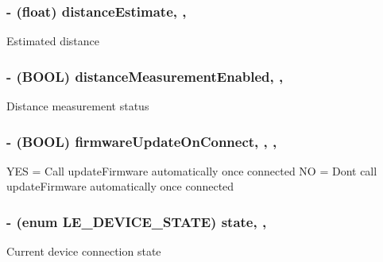 \subsubsection[{distance\+Estimate}]{\setlength{\rightskip}{0pt plus 5cm}-\/ (float) distance\+Estimate\hspace{0.3cm}{\ttfamily [read]}, {\ttfamily [nonatomic]}, {\ttfamily [assign]}}\label{interface_le_snf_device_ab5b9db7753a961a6062947950e516688}
Estimated distance \hypertarget{interface_le_snf_device_a21f7ccd07695a5dec79fa82a6cce2b17}{}
\subsubsection[{distance\+Measurement\+Enabled}]{\setlength{\rightskip}{0pt plus 5cm}-\/ (B\+O\+O\+L) distance\+Measurement\+Enabled\hspace{0.3cm}{\ttfamily [read]}, {\ttfamily [atomic]}, {\ttfamily [assign]}}\label{interface_le_snf_device_a21f7ccd07695a5dec79fa82a6cce2b17}
Distance measurement status \hypertarget{interface_le_snf_device_a1d28882e6c954a9e0799071dcd6f8774}{}
\subsubsection[{firmware\+Update\+On\+Connect}]{\setlength{\rightskip}{0pt plus 5cm}-\/ (B\+O\+O\+L) firmware\+Update\+On\+Connect\hspace{0.3cm}{\ttfamily [read]}, {\ttfamily [write]}, {\ttfamily [nonatomic]}, {\ttfamily [assign]}}\label{interface_le_snf_device_a1d28882e6c954a9e0799071dcd6f8774}
Y\+E\+S = Call \textquotesingle{}update\+Firmware\textquotesingle{} automatically once connected N\+O = Don\textquotesingle{}t call \textquotesingle{}update\+Firmware\textquotesingle{} automatically once connected \hypertarget{interface_le_snf_device_a55e2289b72eb76ecd680df1e988d9814}{}
\subsubsection[{state}]{\setlength{\rightskip}{0pt plus 5cm}-\/ (enum L\+E\+\_\+\+D\+E\+V\+I\+C\+E\+\_\+\+S\+T\+A\+T\+E) state\hspace{0.3cm}{\ttfamily [read]}, {\ttfamily [nonatomic]}, {\ttfamily [assign]}}\label{interface_le_snf_device_a55e2289b72eb76ecd680df1e988d9814}
Current device connection state \hypertarget{interface_le_snf_device_a87d28e38945f818bc093da48ecdbb182}{}
